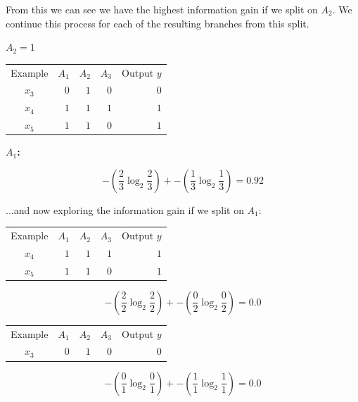 \documentclass{article}
\begin{document}
From this we can see we have the highest information gain if we split on $A_2$. We continue this process for each of the resulting branches from this split.

\noindent \textbf{$A_2=1$}

\begin{center}
    \begin{tabular}{ c r r r r }
        Example & $A_1$ & $A_2$ & $A_3$ & Output $y$\\ 
        $x_3$ & $0$ & $1$ & $0$ & $0$\\
        $x_4$ & $1$ & $1$ & $1$ & $1$\\
        $x_5$ & $1$ & $1$ & $0$ & $1$\\
    \end{tabular}
\end{center}

\noindent \textbf{$A_1$:}

\begin{equation}
    -(\frac{2}{3}\log_2{\frac{2}{3}}) + -(\frac{1}{3}\log_2{\frac{1}{3}}) = 0.92
\end{equation}

\noindent ...and now exploring the information gain if we split on $A_1$:

\begin{center}
    \begin{tabular}{ c r r r r }
        Example & $A_1$ & $A_2$ & $A_3$ & Output $y$\\ 
        $x_4$ & $1$ & $1$ & $1$ & $1$\\
        $x_5$ & $1$ & $1$ & $0$ & $1$\\
    \end{tabular}
\end{center}

\begin{equation}
    -(\frac{2}{2}\log_2{\frac{2}{2}}) + -(\frac{0}{2}\log_2{\frac{0}{2}}) = 0.0
\end{equation}

\begin{center}
    \begin{tabular}{ c r r r r }
        Example & $A_1$ & $A_2$ & $A_3$ & Output $y$\\ 
        $x_3$ & $0$ & $1$ & $0$ & $0$\\
    \end{tabular}
\end{center}

\begin{equation}
    -(\frac{0}{1}\log_2{\frac{0}{1}}) + -(\frac{1}{1}\log_2{\frac{1}{1}}) = 0.0
\end{equation}
\end{document}
